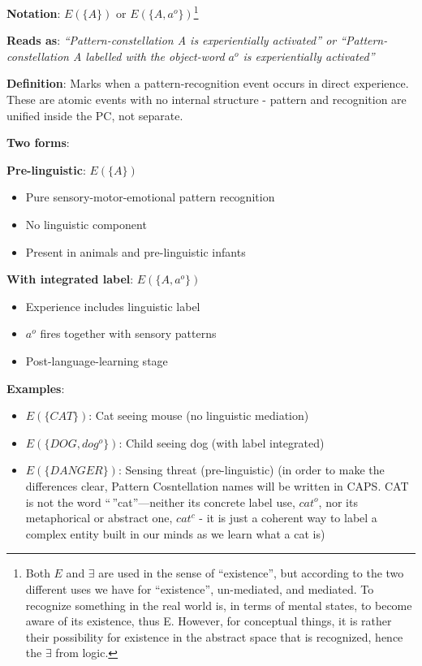 \documentclass[12pt]{article}
\providecommand{\tightlist}{}   %
\begin{document}
\textbf{Notation}: \(E(\{A\})\) or \(E(\{A, a^o\})\)\footnote{Both \(E\) and \(\exists\) are used in the sense of ``existence'', but according to the two different uses we have for ``existence'', un-mediated, and mediated. To recognize something in the real world is, in terms of mental states, to become aware of its existence, thus E. However, for conceptual things, it is rather their possibility for existence in the abstract space that is recognized, hence the \(\exists\) from logic.}

\textbf{Reads as}: \emph{``Pattern-constellation A is experientially activated'' or ``Pattern-constellation A labelled with the object-word \(a^o\) is experientially activated''}

\textbf{Definition}: Marks when a pattern-recognition event occurs in direct experience. These are atomic events with no internal structure - pattern and recognition are unified inside the PC, not separate.

\textbf{Two forms}:

\textbf{Pre-linguistic}: \(E(\{A\})\)

\begin{itemize}
\tightlist
\item
  Pure sensory-motor-emotional pattern recognition
\item
  No linguistic component
\item
  Present in animals and pre-linguistic infants
\end{itemize}

\textbf{With integrated label}: \(E(\{A, a^o\})\)

\begin{itemize}
\tightlist
\item
  Experience includes linguistic label
\item
  \(a^o\) fires together with sensory patterns
\item
  Post-language-learning stage
\end{itemize}

\textbf{Examples}:

\begin{itemize}
\tightlist
\item
  \(E(\{CAT\})\): Cat seeing mouse (no linguistic mediation)
\item
  \(E(\{DOG, dog^o\})\): Child seeing dog (with label integrated)
\item
  \(E(\{DANGER\})\): Sensing threat (pre-linguistic) (in order to make the differences clear, Pattern Cosntellation names will be written in CAPS. CAT is not the word ``\,''cat''---neither its concrete label use, \(cat^o\), nor its metaphorical or abstract one, \(cat^c\) - it is just a coherent way to label a complex entity built in our minds as we learn what a cat is)
\end{itemize}
\end{document}
